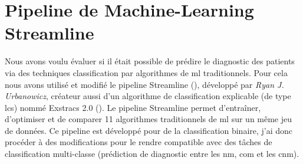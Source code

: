 \section{Pipeline de Machine-Learning Streamline}
Nous avons voulu évaluer si il était possible de prédire le diagnostic des patients via des techniques classification par algorithmes de \gls{ml} traditionnels. Pour cela nous avons utilisé et modifié le pipeline Streamline (\cite{urbanowicz_streamline_2022}), développé par \textit{Ryan J. Urbanowicz}, créateur aussi d'un algorithme de classification explicable (de type \gls{lcs})  nommé Exstracs 2.0 (\cite{urbanowicz_exstracs_2015}).
Le pipeline Streamline permet d'entraîner, d'optimiser et de comparer 11 algorithmes traditionnels de \gls{ml} sur un même jeu de données. Ce pipeline est développé pour de la classification binaire, j'ai donc procéder à des modifications pour le rendre compatible avec des tâches de classification multi-classe (prédiction de diagnostic entre les \gls{nm}, \gls{com} et les \gls{cnm}).

